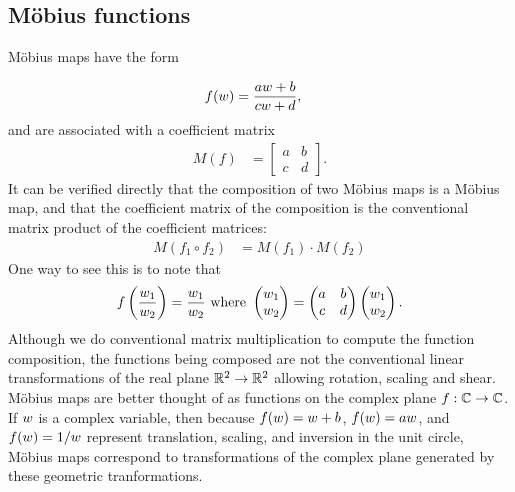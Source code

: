 \subsection{M\"obius functions}
\label{sec:moebiusdef}
M\"obius maps have the form

\begin{align}	f(w) &=  \frac{a w +b}{c w+ d},
\end{align}
and are associated with a coefficient matrix
\begin{align}
	M(f) &=
	\begin{bmatrix}
		a & b \\ c & d	\end{bmatrix}.
\end{align}
It can be verified directly that the composition of two M\"obius maps is a M\"obius map, and that the coefficient matrix of the composition is the conventional matrix product of the coefficient matrices:
\begin{align}
	M(f_1 \circ f_2) &= M(f_1 ) \cdot M( f_2)
\end{align}
One way to see this is to note that 
\begin{equation}
	f\left(\frac{w_1}{w_2}\right) =\frac{w_1}{w_2}  \mbox{ where } 	\begin{pmatrix}
		w_1 \\ w_2 
	\end{pmatrix} = 
	\begin{pmatrix}
		a & b \\ c & d
	\end{pmatrix} 
	\begin{pmatrix}
		w_1 \\ w_2
	\end{pmatrix}.
\end{equation}
Although we do conventional matrix multiplication to compute the function composition, the functions being composed are not the conventional linear transformations of the real plane  $\mathbb{R}^2\rightarrow\mathbb{R}^2$ allowing rotation, scaling and shear. M\"obius maps are better thought of as functions on the complex plane  $f:\mathbb{C}\rightarrow\mathbb{C}$.  
If $w$ is a complex variable, then because $f(w)=w+b$, $f(w)=a w$, and $f(w)=1/w$  represent translation, scaling, and inversion in the unit circle,  M\"obius maps correspond to transformations of the complex plane generated by these geometric tranformations. 

